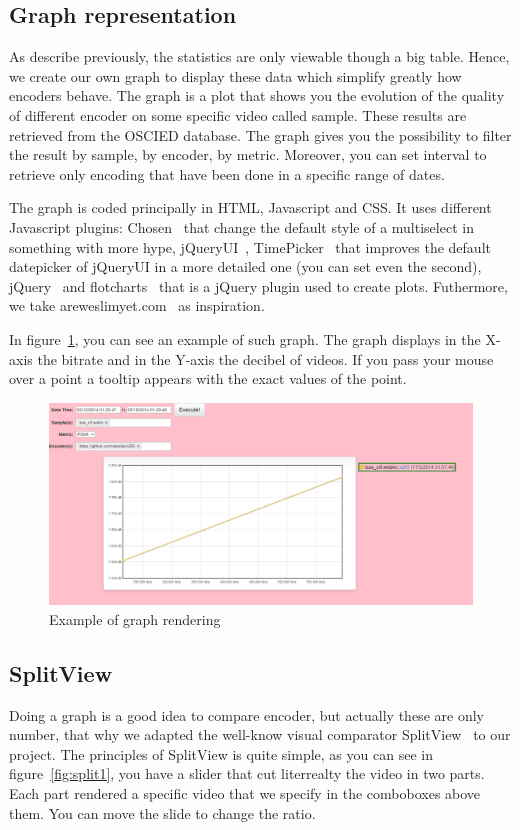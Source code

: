 \documentclass[a4paper,12pt]{article}
\begin{document}
\subsection{Graph representation} As describe previously, the statistics are
only viewable though a big table. Hence, we create our own graph to display
these data which simplify greatly how encoders behave. The graph is a plot that
shows you the evolution of the quality of different encoder on some specific
video called sample. These results are retrieved from the OSCIED database. The
graph gives you the possibility to filter the result by sample, by encoder, by
metric. Moreover, you can set interval to retrieve only encoding that have been
done in a specific range of dates.

The graph is coded principally in HTML, Javascript and CSS. It uses different
Javascript plugins: Chosen~\cite{harvesthq_chosen}
that change the default style of a multiselect in something with more hype,
jQueryUI~\cite{jqueryui},
TimePicker~\cite{timepicker} that
improves the default datepicker of jQueryUI in a more detailed one (you can set
even the second), jQuery~\cite{jquery} and
flotcharts~\cite{flotchart} that is a jQuery plugin
used to create plots. Futhermore, we take areweslimyet.com~\cite{areweslimyet} as inspiration.

In figure~\ref{fig:graph1}, you can see an example of such graph. The graph
displays in the X-axis the bitrate and in the Y-axis the decibel of videos. If
you pass your mouse over a point a tooltip appears with the exact values of the
point.

\begin{figure}[!h] \centering
  \includegraphics[width=1\textwidth]{figures/graph1.png}
  \caption{Example of graph rendering}
  \label{fig:graph1}
\end{figure}

\subsection{SplitView} Doing a graph is a good idea to compare encoder, but actually these are only number, that why we adapted the well-know visual comparator SplitView~\cite{splitview} to our project. The principles of SplitView is quite simple, as you can see in figure~\ref{fig:split1}, you have a slider that cut literrealty the video in two parts. Each part rendered a specific video that we specify in the comboboxes above them. You can move the slide to change the ratio.
\end{document}
